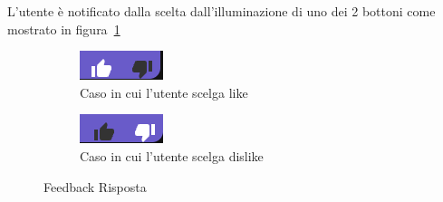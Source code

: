 L'utente è notificato dalla scelta dall'illuminazione di uno dei 2 bottoni come mostrato in figura~\ref{fig:likedislike}
\begin{figure}[h!]
    \centering
    \begin{subfigure}{0.2\textwidth}
        \centering
        \includegraphics[width=\textwidth]{./img/like.png}
        \caption{Caso in cui l'utente scelga like}
    \end{subfigure}
    \hspace{0.05\textwidth}
    \begin{subfigure}{0.2\textwidth}
        \centering
        \includegraphics[width=\textwidth]{./img/dislike.png}
        \caption{Caso in cui l'utente scelga dislike}
    \end{subfigure}
    \caption{Feedback Risposta}
    \label{fig:likedislike}
\end{figure}

\newpage

